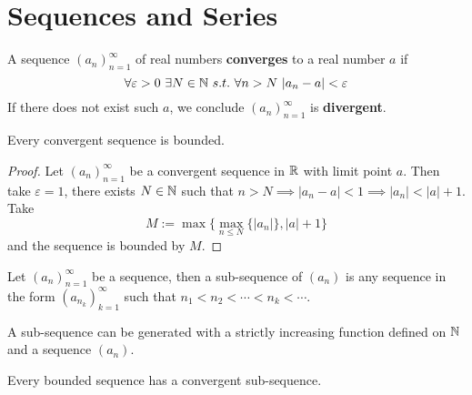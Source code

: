 \documentclass[11pt]{article}
\newcommand{\seq}[2]{({#1}_{#2})_{{#2}=1}^\infty}
\begin{document}
    \section{Sequences and Series}
        \begin{definition}
            A sequence $\seq{a}{n}$ of real numbers \textbf{converges} to a real number $a$ if
            \begin{equation}
                \forall \varepsilon > 0\ \exists N \in \mathbb{N}\ s.t.\ \forall n > N\ |a_n - a| < \varepsilon
            \end{equation}
            If there does not exist such $a$, we conclude $\seq{a}{n}$ is \textbf{divergent}.
        \end{definition}
        
        \begin{theorem}
            Every convergent sequence is bounded.
        \end{theorem}
        
        \begin{proof}
            Let $\seq{a}{n}$ be a convergent sequence in $\mathbb{R}$ with limit point $a$. Then take $\varepsilon=1$, there exists $N \in \mathbb{N}$ such that $n > N \implies |a_n - a| < 1 \implies |a_n| < |a| + 1$. Take 
            \begin{equation}
                M := \max\{\max_{n \leq N}\{|a_n|\}, |a| +1 \}
            \end{equation}
            and the sequence is bounded by $M$.
        \end{proof}
        
        \begin{definition}
            Let $\seq{a}{n}$ be a sequence, then a sub-sequence of $(a_n)$ is any sequence in the form $(a_{n_k})_{k=1}^\infty$ such that $n_1 < n_2 < \cdots < n_k < \cdots$.
        \end{definition}
        
        \begin{remark}
            A sub-sequence can be generated with a strictly increasing function defined on $\mathbb{N}$ and a sequence $(a_n)$.
        \end{remark}
        
        \begin{theorem}
            Every bounded sequence has a convergent sub-sequence.
        \end{theorem}
        
\end{document}
